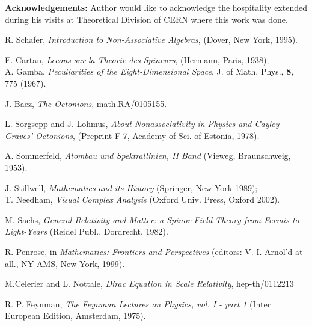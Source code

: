 \documentclass[a4paper,12pt]{article}
\begin{document}

\vskip 1cm

{\bf Acknowledgements:} Author would like to acknowledge the hospitality
extended during his visits at Theoretical Division of CERN where this work was done.


\begin{thebibliography}{99}

 R. Schafer,
            {\it Introduction to Non-Associative Algebras},
            (Dover, New York, 1995).

 E. Cartan,
             {\it Lecons sur la Theorie des Spineurs},
             (Hermann, Paris, 1938); \\
              A. Gamba,
             {\it Peculiarities of the Eight-Dimensional Space},
             J. of Math. Phys., {\bf 8}, 775 (1967).

 J. Baez,
             {\it The Octonions},
             math.RA/0105155.

 L. Sorgsepp and J. Lohmus,
               {\it About Nonassociativity in Physics and Cayley-Graves' 
                Octonions},
               (Preprint F-7, Academy of Sci. of Estonia, 1978).

 A. Sommerfeld,
            {\it Atombau und Spektrallinien, II Band} 
            (Vieweg, Braunschweig, 1953).

 J. Stillwell,
             {\it Mathematics and its History}
             (Springer, New York 1989); \\
             T. Needham,
             {\it Visual Complex Analysis}
             (Oxford Univ. Press, Oxford 2002). 

 M. Sachs,
            {\it General Relativity and Matter: a Spinor Field Theory from 
            Fermis to Light-Years} (Reidel Publ., Dordrecht, 1982).

 R. Penrose,
            in {\it Mathematics: Frontiers and Perspectives}
            (editors: V. I. Arnol'd at all., NY AMS, New York, 1999).

 M.Celerier and L. Nottale,
              {\it Dirac Equation in Scale Relativity},
              hep-th/0112213 

 R. P. Feynman,
            {\it The Feynman Lectures on Physics, vol. I - part 1} 
            (Inter European Edition, Amsterdam, 1975).


\end{thebibliography}
\end{document}
